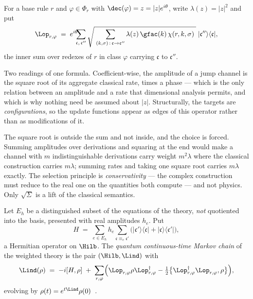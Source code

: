 \begin{definition}
\label{wt:def:jump}
For a base rule $r$ and $\varphi \in \Phi_r$ with $\dec(\varphi) = z = |z|e^{i\theta}$,
write $\lambda(z) = |z|^2$ and put
\[
  \Lop_{r,\varphi}
  \;=\;
  e^{i\theta}\!\!\!\sum_{\mathfrak{c},\,\mathfrak{c}''}
  \sqrt{\;\sum_{(k,\sigma)\,:\,\mathfrak{c} \to \mathfrak{c}''}
        \lambda(z)\,\gfac(k)\,\chi(r,k,\sigma)\;}\;
  |\mathfrak{c}''\rangle\langle\mathfrak{c}| ,
\]
the inner sum over redexes of $r$ in class $\varphi$ carrying $\mathfrak{c}$ to
$\mathfrak{c}''$.
\end{definition}

Two readings of one formula. Coefficient-wise, the amplitude of a jump channel is the
square root of its aggregate classical rate, times a phase --- which is the only relation
between an amplitude and a rate that dimensional analysis permits, and which is why nothing
need be assumed about $|z|$. Structurally, the targets are \emph{configurations}, so the
update functions appear as edges of this operator rather than as modifications of it.

The square root is outside the sum and not inside, and the choice is forced. Summing
amplitudes over derivations and squaring at the end would make a channel with $m$
indistinguishable derivations carry weight $m^2\lambda$ where the classical construction
carries $m\lambda$; summing rates and taking one square root carries $m\lambda$ exactly.
The selection principle is \emph{conservativity} --- the complex construction must reduce
to the real one on the quantities both compute --- and not physics. Only $\sqrt{\Sigma}$ is
a lift of the classical semantics.

\begin{definition}
\label{wt:def:hamiltonian}
Let $E_h$ be a distinguished subset of the equations of the theory, \emph{not} quotiented
into the basis, presented with real amplitudes $h_e$. Put
\[
  H \;=\; \sum_{e \in E_h} h_e \!\!\sum_{\mathfrak{c} \equiv_e \mathfrak{c}'}\!\!
  \bigl(|\mathfrak{c}'\rangle\langle\mathfrak{c}| + |\mathfrak{c}\rangle\langle\mathfrak{c}'|\bigr),
\]
a Hermitian operator on $\Hilb$. The \emph{quantum continuous-time Markov chain} of the
weighted theory is the pair $(\Hilb, \Lind)$ with
\[
  \Lind(\rho) \;=\; -i[H,\rho]
  \;+\; \sum_{r,\varphi}\Bigl( \Lop_{r,\varphi}\rho\Lop^{\dagger}_{r,\varphi}
  - \tfrac12\bigl\{\Lop^{\dagger}_{r,\varphi}\Lop_{r,\varphi}, \rho\bigr\}\Bigr),
\]
evolving by $\rho(t) = e^{t\Lind}\rho(0)$~\cite{cao2021quantum}.
\end{definition}

